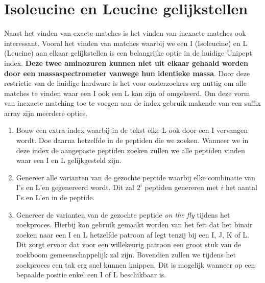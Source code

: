 \section{Isoleucine en Leucine gelijkstellen}\label{sec:isoleucine-en-leucine-equivalentie}
Naast het vinden van exacte matches is het vinden van inexacte matches ook interessant.
Vooral het vinden van matches waarbij we een I (Isoleucine) en L (Leucine) aan elkaar gelijkstellen is een belangrijke optie in de huidige Unipept index.
\textbf{Deze twee aminozuren kunnen niet uit elkaar gehaald worden door een massaspectrometer vanwege hun identieke massa}.
Door deze restrictie van de huidige hardware is het voor onderzoekers erg nuttig om alle matches te vinden waar een I ook een L kan zijn of omgekeerd.
Om deze vorm van inexacte matching toe te voegen aan de index gebruik makende van een suffix array zijn meerdere opties.
\begin{enumerate}
    \item Bouw een extra index waarbij in de tekst elke L ook door een I vervangen wordt.
    Doe daarna hetzelfde in de peptiden die we zoeken.
    Wanneer we in deze index de aangepaste peptiden zoeken zullen we alle peptiden vinden waar een I en L gelijkgesteld zijn.
    \item Genereer alle varianten van de gezochte peptide waarbij elke combinatie van I's en L'en gegenereerd wordt.
    Dit zal $2^i$ peptiden genereren met $i$ het aantal I's en L'en in de peptide.
    \item Genereer de varianten van de gezochte peptide \textit{on the fly} tijdens het zoekproces.
    Hierbij kan gebruik gemaakt worden van het feit dat het binair zoeken naar een I en L hetzelfde patroon af legt tenzij bij een I, J, K of L\@.
    Dit zorgt ervoor dat voor een willekeurig patroon een groot stuk van de zoekboom gemeenschappelijk zal zijn.
    Bovendien zullen we tijdens het zoekproces een tak erg snel kunnen knippen.
    Dit is mogelijk wanneer op een bepaalde positie enkel een I of L beschikbaar is.
\end{enumerate}

